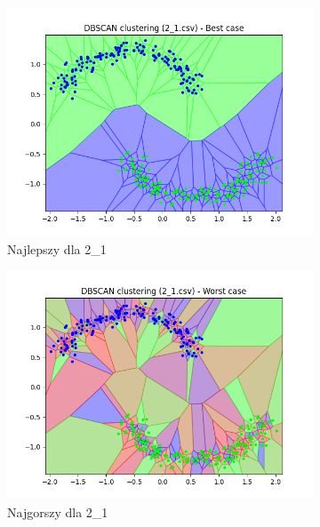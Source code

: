 \documentclass[12pt]{article}
\begin{document}
\begin{figure}[H]
\begin{subfigure}[b]{0.24\textwidth}
        \includegraphics[width=\linewidth]{img/exp_2/dbscan/2_1_best.png}
        \caption{Najlepszy dla 2\_1}
    \end{subfigure}
    \hfill
    \begin{subfigure}[b]{0.24\textwidth}
        \includegraphics[width=\linewidth]{img/exp_2/dbscan/2_1_worst.png}
        \caption{Najgorszy dla 2\_1}
    \end{subfigure}
    \begin{subfigure}[b]{0.24\textwidth}

\end{subfigure}
\end{figure}
\end{document}
